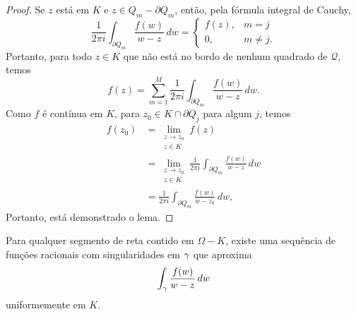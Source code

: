 \begin{proof}
        Se $z$ está em $K$ e $z \in Q_m - \partial Q_m$, então, pela fórmula integral de Cauchy,
        \begin{equation*}
            \frac{1}{2 \pi i}\int_{\partial Q_m}\frac{f(w)}{w-z}\, dw 
            = 
            \begin{cases}
                f(z), &m = j \\
                0, &m \neq j.
            \end{cases}
        \end{equation*}
        Portanto, para todo $z\in K$ que não está no bordo de nenhum quadrado de $\mathcal{Q}$, 
        temos
        \begin{equation*}
            f(z) = \sum^{M}_{m=1}\frac{1}{2 \pi i}\int_{\partial Q_m}\frac{f(w)}{w-z}\,dw.
        \end{equation*}
        Como $f$ é contínua em $K$, para $z_0 \in K \cap \partial Q_j$ para algum $j$, temos
        \begin{align*}
            f(z_0) &= \lim_{\substack{z \to z_0 \\ z\in K}} f(z) \\
                   &= \lim_{\substack{z \to z_0 \\ z\in K}} 
                   \frac{1}{2 \pi i}\int_{\partial Q_m}\frac{f(w)}{w-z}\,dw \\
                   &= \frac{1}{2 \pi i}\int_{\partial Q_m}\frac{f(w)}{w-z_0}\,dw,
        \end{align*}
        Portanto, está demonstrado o lema.
    \end{proof}
    \begin{lema}
    \label{LR2}
        Para qualquer segmento de reta contido em $\Omega - K$, existe uma sequência 
        de funções racionais com singularidades em $\gamma$ que aproxima
        \begin{equation*}
        \int_\gamma \frac{f(w)}{w-z}\,dw
        \end{equation*}
        uniformemente em $K$.
    \end{lema}

